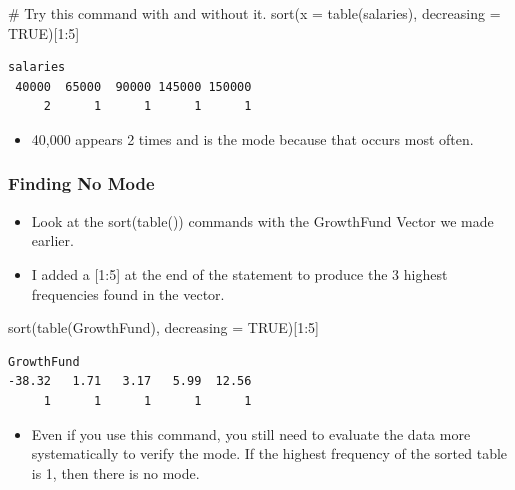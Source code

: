 \documentclass[
  letterpaper,
  DIV=11,
  numbers=noendperiod]{scrreprt}
\newenvironment{Shaded}{\begin{snugshade}}{\end{snugshade}}
\newcommand{\AttributeTok}[1]{\textcolor[rgb]{0.40,0.45,0.13}{#1}}
\newcommand{\CommentTok}[1]{\textcolor[rgb]{0.37,0.37,0.37}{#1}}
\newcommand{\ConstantTok}[1]{\textcolor[rgb]{0.56,0.35,0.01}{#1}}
\newcommand{\DecValTok}[1]{\textcolor[rgb]{0.68,0.00,0.00}{#1}}
\newcommand{\FunctionTok}[1]{\textcolor[rgb]{0.28,0.35,0.67}{#1}}
\newcommand{\NormalTok}[1]{\textcolor[rgb]{0.00,0.23,0.31}{#1}}
\newcommand{\SpecialCharTok}[1]{\textcolor[rgb]{0.37,0.37,0.37}{#1}}
\providecommand{\tightlist}{%
  \setlength{\itemsep}{0pt}\setlength{\parskip}{0pt}}\usepackage{longtable,booktabs,array}
\begin{document}
\begin{Shaded}
\begin{Highlighting}[]
\CommentTok{\# Try this command with and without it.}
\FunctionTok{sort}\NormalTok{(}\AttributeTok{x =} \FunctionTok{table}\NormalTok{(salaries), }\AttributeTok{decreasing =} \ConstantTok{TRUE}\NormalTok{)[}\DecValTok{1}\SpecialCharTok{:}\DecValTok{5}\NormalTok{]}
\end{Highlighting}
\end{Shaded}

\begin{verbatim}
salaries
 40000  65000  90000 145000 150000 
     2      1      1      1      1 
\end{verbatim}

\begin{itemize}
\tightlist
\item
  40,000 appears 2 times and is the mode because that occurs most often.
\end{itemize}

\subsubsection{Finding No Mode}\label{finding-no-mode}

\begin{itemize}
\tightlist
\item
  Look at the sort(table()) commands with the GrowthFund Vector we made
  earlier.
\item
  I added a {[}1:5{]} at the end of the statement to produce the 3
  highest frequencies found in the vector.
\end{itemize}

\begin{Shaded}
\begin{Highlighting}[]
\FunctionTok{sort}\NormalTok{(}\FunctionTok{table}\NormalTok{(GrowthFund), }\AttributeTok{decreasing =} \ConstantTok{TRUE}\NormalTok{)[}\DecValTok{1}\SpecialCharTok{:}\DecValTok{5}\NormalTok{]}
\end{Highlighting}
\end{Shaded}

\begin{verbatim}
GrowthFund
-38.32   1.71   3.17   5.99  12.56 
     1      1      1      1      1 
\end{verbatim}

\begin{itemize}
\tightlist
\item
  Even if you use this command, you still need to evaluate the data more
  systematically to verify the mode. If the highest frequency of the
  sorted table is 1, then there is no mode.
\end{itemize}
\end{document}
